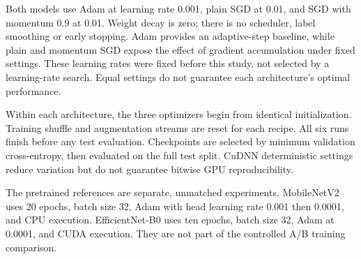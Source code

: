 \documentclass[11pt,a4paper]{article}
\begin{document}
Both models use Adam at learning rate 0.001, plain SGD at 0.01, and SGD with momentum 0.9 at 0.01. Weight decay is zero; there is no scheduler, label smoothing or early stopping. Adam provides an adaptive-step baseline, while plain and momentum SGD expose the effect of gradient accumulation under fixed settings. These learning rates were fixed before this study, not selected by a learning-rate search. Equal settings do not guarantee each architecture's optimal performance.

Within each architecture, the three optimizers begin from identical initialization. Training shuffle and augmentation streams are reset for each recipe. All six runs finish before any test evaluation. Checkpoints are selected by minimum validation cross-entropy, then evaluated on the full test split. CuDNN deterministic settings reduce variation but do not guarantee bitwise GPU reproducibility.

The pretrained references are separate, unmatched experiments. MobileNetV2 uses 20 epochs, batch size 32, Adam with head learning rate 0.001 then 0.0001, and CPU execution. EfficientNet-B0 uses ten epochs, batch size 32, Adam at 0.0001, and CUDA execution. They are not part of the controlled A/B training comparison.
\end{document}
